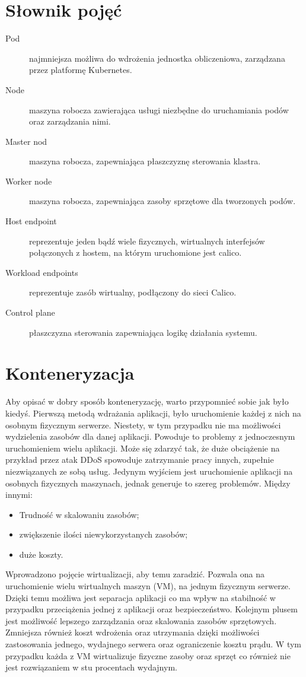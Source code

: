 \documentclass[pl,final,oneside]{mgr} %
\begin{document}
\section{Słownik pojęć}
\begin{description}
\item[Pod] najmniejsza możliwa do wdrożenia jednostka obliczeniowa, zarządzana przez platformę Kubernetes.
\item[Node] maszyna robocza zawierająca usługi niezbędne do uruchamiania podów oraz zarządzania nimi.
\item[Master nod] maszyna robocza, zapewniająca płaszczyznę sterowania klastra.
\item[Worker node] maszyna robocza, zapewniająca zasoby sprzętowe dla tworzonych podów.
\item[Host endpoint] reprezentuje jeden bądź wiele fizycznych, wirtualnych interfejsów połączonych z hostem, na którym uruchomione jest calico.
\item[Workload endpoints] reprezentuje zasób wirtualny, podłączony do sieci Calico.
\item[Control plane] płaszczyzna sterowania zapewniająca logikę działania systemu.
\end{description}
\section{Konteneryzacja}
Aby opisać w dobry sposób konteneryzację, warto przypomnieć sobie jak było kiedyś. Pierwszą metodą wdrażania aplikacji, było uruchomienie każdej z nich na osobnym fizycznym serwerze. Niestety, w tym przypadku nie ma możliwości wydzielenia zasobów dla danej aplikacji. Powoduje to problemy z jednoczesnym uruchomieniem wielu aplikacji. Może się zdarzyć tak, że duże obciążenie na przykład przez atak DDoS spowoduje zatrzymanie pracy innych, zupełnie niezwiązanych ze sobą usług. Jedynym wyjściem jest uruchomienie aplikacji na osobnych fizycznych maszynach, jednak generuje to szereg problemów. Między innymi:
\begin{itemize}
	\item Trudność w skalowaniu zasobów;
	\item zwiększenie ilości niewykorzystanych zasobów;
	\item duże koszty.
\end{itemize}
Wprowadzono pojęcie wirtualizacji, aby temu zaradzić. Pozwala ona na uruchomienie wielu wirtualnych maszyn (VM), na jednym fizycznym serwerze. Dzięki temu możliwa jest separacja aplikacji co ma wpływ na stabilność w przypadku przeciążenia jednej z aplikacji oraz bezpieczeństwo. Kolejnym plusem jest możliwość lepszego zarządzania oraz skalowania zasobów sprzętowych. Zmniejsza również koszt wdrożenia oraz utrzymania dzięki możliwości zastosowania jednego, wydajnego serwera oraz ograniczenie kosztu prądu. W tym przypadku każda z VM wirtualizuje fizyczne zasoby oraz sprzęt co również nie jest rozwiązaniem w stu procentach wydajnym.
\end{document}
